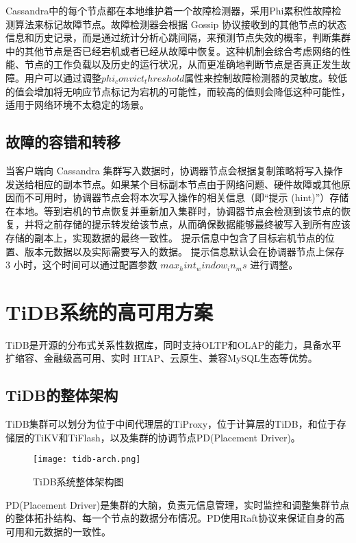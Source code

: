Cassandra中的每个节点都在本地维护着一个故障检测器，采用Phi累积性故障检测算法来标记故障节点。故障检测器会根据 Gossip 协议接收到的其他节点的状态信息和历史记录，而是通过统计分析心跳间隔，来预测节点失效的概率，判断集群中的其他节点是否已经宕机或者已经从故障中恢复。这种机制会综合考虑网络的性能、节点的工作负载以及历史的运行状况，从而更准确地判断节点是否真正发生故障。用户可以通过调整$phi_convict_threshold$属性来控制故障检测器的灵敏度。较低的值会增加将无响应节点标记为宕机的可能性，而较高的值则会降低这种可能性，适用于网络环境不太稳定的场景。


\subsection{故障的容错和转移}

当客户端向 Cassandra 集群写入数据时，协调器节点会根据复制策略将写入操作发送给相应的副本节点。如果某个目标副本节点由于网络问题、硬件故障或其他原因而不可用时，协调器节点会将本次写入操作的相关信息（即“提示 (hint)”）存储在本地。等到宕机的节点恢复并重新加入集群时，协调器节点会检测到该节点的恢复，并将之前存储的提示转发给该节点，从而确保数据能够最终被写入到所有应该存储的副本上，实现数据的最终一致性。
提示信息中包含了目标宕机节点的位置、版本元数据以及实际需要写入的数据。
提示信息默认会在协调器节点上保存 3 小时，这个时间可以通过配置参数 $max_hint_window_in_ms$ 进行调整。


\section{TiDB系统的高可用方案}
TiDB\cite{huang2020tidb}是开源的分布式关系性数据库，同时支持OLTP和OLAP的能力，具备水平扩缩容、金融级高可用、实时 HTAP、云原生、兼容MySQL生态等优势。

\subsection{TiDB的整体架构}

TiDB集群可以划分为位于中间代理层的TiProxy，位于计算层的TiDB，和位于存储层的TiKV和TiFlash，以及集群的协调节点PD(Placement Driver)。

\begin{figure}
  \centering
  \texttt{[image: tidb-arch.png]}
  \caption{TiDB系统整体架构图}
  \label{fig:tidb-arch}
\end{figure}

PD(Placement Driver)是集群的大脑，负责元信息管理，实时监控和调整集群节点的整体拓扑结构、每一个节点的数据分布情况。PD使用Raft协议来保证自身的高可用和元数据的一致性。

